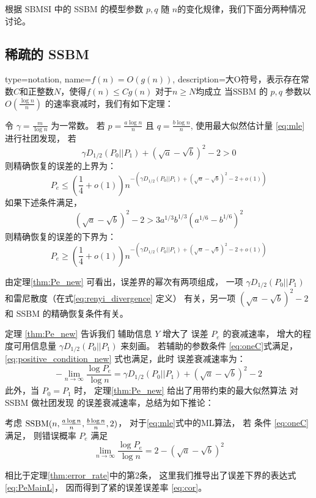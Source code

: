 根据 SBMSI 中的 SSBM 的模型参数 $p,q$ 随 $n$的变化规律，我们下面分两种情况讨论。
\subsection{稀疏的 SSBM }
{
  type=notation,
  name={$f(n)=O(g(n))$},
  description={大O符号，表示存在常数$C$和正整数$N$，使得$f(n)\leq C g(n)$ 对于$n\geq N$均成立}
}
当SSBM 的 $p,q$ 参数以 $O(\frac{ \log n}{n})$
的速率衰减时，我们有如下定理：
\begin{theorem}\label{thm:Pe_new}
    令
    $\gamma = \frac{ m}{\log n}$
    为一常数。
    若
    $p = \frac{a \log n }{n} $ 且 $q = 
    \frac{b \log n } {n}$, 使用最大似然估计量 \eqref{eq:mle}
    进行社团发现，
    若
    \begin{equation}\label{eq:positive_condition_new}
    \gamma D_{1/2}(P_0||P_1) +
     (\sqrt{a} - \sqrt{b})^2-2 > 0
    \end{equation}
    则精确恢复的误差的上界为：
    \begin{equation}\label{eq:PeMain}
    P_e \leq (\frac{1}{4}+o(1)) n^{-\left(\gamma D_{1/2}(P_0||P_1) + (\sqrt{a} - \sqrt{b})^2-2 + o(1)\right) }
    \end{equation}
    如果下述条件满足，
    \begin{align}
    (\sqrt{a}-\sqrt{b})^2-2 
    > 3a^{1/3}b^{1/3}(a^{1/6}-b^{1/6})^2\label{eq:oneC}
    \end{align}
    则精确恢复的误差的下界为：
    \begin{equation}\label{eq:PeMainL}
    P_e \geq (\frac{1}{4}+o(1)) n^{-\left(\gamma D_{1/2}(P_0||P_1) + (\sqrt{a} - \sqrt{b})^2-2 + o(1)\right)}
    \end{equation}
\end{theorem}

由定理\ref{thm:Pe_new}
可看出，误差界的幂次有两项组成，
一项 $\gamma D_{1/2}(P_0||P_1) $ 
和雷尼散度（在式\eqref{eq:renyi_divergence} 定义）
有关，另一项 $ (\sqrt{a} - \sqrt{b})^2-2 $
和 SSBM 的精确恢复条件有关。

定理
\ref{thm:Pe_new} 告诉我们
辅助信息  $Y$  增大了 误差 $P_e$ 的衰减速率，
增大的程度可用信息量 $\gamma D_{1/2}(P_0||P_1)$ 
来刻画。
若辅助的参数条件 \eqref{eq:oneC}式满足，
\eqref{eq:positive_condition_new} 式也满足，此时
误差衰减速率为：
$$
-\lim_{n\to \infty} \frac{\log P_e}{\log n}
= \gamma D_{1/2}(P_0||P_1) + (\sqrt{a} - \sqrt{b})^2-2
$$
此外，当 $P_0=P_1$ 时，
定理\ref{thm:Pe_new} 
给出了用带约束的最大似然算法
对SSBM 做社团发现
的误差衰减速率，总结为如下推论：
\begin{corollary}\label{cor:sbm}
考虑
$\operatorname{SSBM}(n,\frac{a\log n}{n}, \frac{b \log n}{n}, 2)$，
对于\eqref{eq:mle}式中的ML算法， 
若 条件 \eqref{eq:oneC} 满足，
则错误概率 $P_e$ 满足
\begin{equation}\label{eq:cor}
\lim_{n\to \infty} \frac{\log P_e}{\log n} =2-(\sqrt{a} - \sqrt{b})^2
\end{equation}

\end{corollary}
相比于定理\ref{thm:error_rate}中的第2条，
这里我们推导出了误差下界的表达式 \eqref{eq:PeMainL}，
因而得到了紧的误差误差率 \eqref{eq:cor}。

